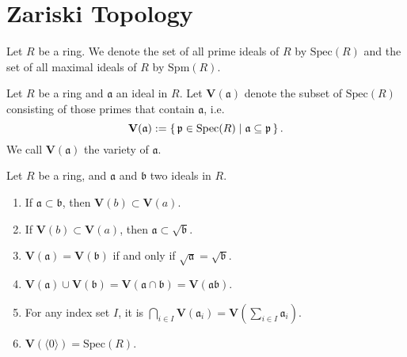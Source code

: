\chapter{Zariski Topology}

\begin{defn}[Spectrum]
    Let \(R\) be a ring. We denote the set of all prime ideals of \(R\) by \(\mathrm{Spec}(R)\) and the set of all maximal ideals of \(R\) by \(\mathrm{Spm}(R)\).
\end{defn}

\begin{defn}[Variety]
    Let \(R\) be a ring and \(\mathfrak{a}\) an ideal in \(R\). Let \(\mathbf{V}(\mathfrak{a})\) denote the subset of \(\mathrm{Spec}(R)\) consisting of those primes that contain \(\mathfrak{a}\), i.e.
    \begin{equation}
        \mathbf{V}(\mathfrak{a}) := \left\{\, \mathfrak{p} \in \mathrm{Spec}(R) \mathrel{\mid} \mathfrak{a} \subseteq \mathfrak{p} \,\right\}\text{.}
    \end{equation}
    We call \(\mathbf{V}(\mathfrak{a})\) the variety of \(\mathfrak{a}\).
\end{defn}

\begin{prps}
    Let \(R\) be a ring, and \(\mathfrak{a}\) and \(\mathfrak{b}\) two ideals in \(R\).
    \begin{enumerate}
        \item If \(\mathfrak{a} \subset \mathfrak{b}\), then \(\mathbf{V}(b) \subset \mathbf{V}(a)\).
        \item If \(\mathbf{V}(b) \subset \mathbf{V}(a)\), then \(\mathfrak{a} \subset \sqrt{\mathfrak{b}}\).
        \item \(\mathbf{V}(\mathfrak{a}) = \mathbf{V}(\mathfrak{b})\) if and only if \(\sqrt{\mathfrak{a}} = \sqrt{\mathfrak{b}}\).
        \item \(\mathbf{V}(\mathfrak{a}) \cup \mathbf{V}(\mathfrak{b}) = \mathbf{V}(\mathfrak{a} \cap \mathfrak{b}) = \mathbf{V}(\mathfrak{a}\mathfrak{b})\).
        \item For any index set \(I\), it is \(\bigcap_{i \in I}\mathbf{V}(\mathfrak{a}_i) = \mathbf{V}(\sum_{i \in I}\mathfrak{a}_i)\).
        \item \(\mathbf{V}(\langle 0 \rangle) = \mathrm{Spec}(R)\).
    \end{enumerate}
\end{prps}

